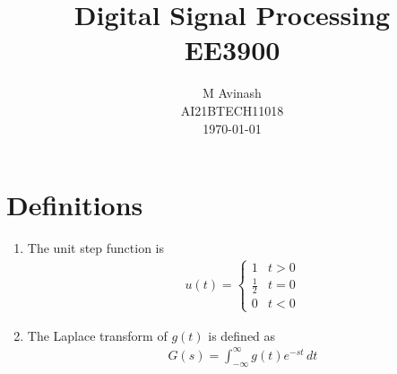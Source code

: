 \documentclass[journal,12pt,twocolumn]{IEEEtran}
\numberwithin{equation}{section}
\renewcommand\thesection{\arabic{section}}
\begin{document}
                             
\title{ Digital Signal Processing  \\ 
	\Large EE3900
}
\author{M Avinash \\ \normalsize AI21BTECH11018 \\ \vspace*{20pt} \normalsize \today  }
 \maketitle 
 \tableofcontents
 \section{Definitions}
\begin{enumerate}[label=\arabic*.,ref=\thesection.\theenumi]
\item The unit step function is 
\begin{align}
\label{eq:unit-step}
u(t) =
\begin{cases}
1 & t > 0
\\
	\frac{1}{2} & t = 0
\\
0 & t < 0
\end{cases}
\end{align}
\item The Laplace transform of $g(t)$ is defined as 
\begin{align}
	G(s) = \int_{-\infty}^{\infty} g(t) e^{-st}\, dt
\end{align}
 \end{enumerate}
\end{document}
